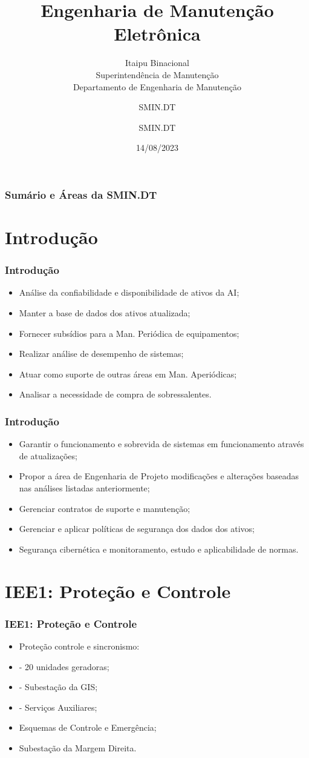 \documentclass{beamer}
\title{\textbf{Engenharia de Manutenção Eletrônica\\}}
\subtitle{Itaipu Binacional \\ Superintendência de Manutenção \\ Departamento de Engenharia de Manutenção}
\author{SMIN.DT}
\author{SMIN.DT}
\date{14/08/2023}
\begin{document}
\frame{\titlepage}

\begin{frame}
\frametitle{Sumário e Áreas da SMIN.DT}
\tableofcontents
\end{frame}

\section[Introdução]{Introdução}
\begin{frame}
\frametitle{Introdução}
\begin{itemize}
    \item Análise da confiabilidade e disponibilidade de ativos da AI;
    \item Manter a base de dados dos ativos atualizada;
    \item Fornecer subsídios para a Man. Periódica de equipamentos;
    \item Realizar análise de desempenho de sistemas;
    \item Atuar como suporte de outras áreas em Man. Aperiódicas;
    \item Analisar a necessidade de compra de sobressalentes.
    \end{itemize}
\end{frame}

\begin{frame}
\frametitle{Introdução}
\begin{itemize}
    \item Garantir o funcionamento e sobrevida de sistemas em funcionamento através de atualizações;
    \item Propor a área de Engenharia de Projeto modificações e alterações baseadas nas análises listadas anteriormente;
    \item Gerenciar contratos de suporte e manutenção;
    \item Gerenciar e aplicar políticas de segurança dos dados dos ativos;
    \item Segurança cibernética e monitoramento, estudo e aplicabilidade de normas.
\end{itemize}
\end{frame}

\section[IEE1]{IEE1: Proteção e Controle}
\begin{frame}
\frametitle{IEE1: Proteção e Controle}
\begin{itemize}
    \item Proteção controle e sincronismo:
    \item - 20 unidades geradoras;
    \item - Subestação da GIS; 
    \item - Serviços Auxiliares;
    \item Esquemas de Controle e Emergência;
    \item Subestação da Margem Direita.
\end{itemize}
\end{frame}
\end{document}
